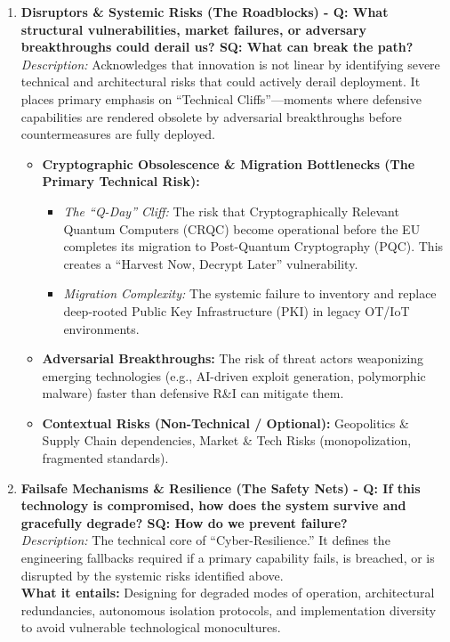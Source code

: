 \documentclass[12pt,a4paper]{article}
\begin{document}
\begin{enumerate}
    \item \textbf{Disruptors \& Systemic Risks (The Roadblocks) - Q: What structural vulnerabilities, market failures, or adversary breakthroughs could derail us? SQ: What can break the path?}\\
    \textit{Description:} Acknowledges that innovation is not linear by identifying severe technical and architectural risks that could actively derail deployment. It places primary emphasis on ``Technical Cliffs''---moments where defensive capabilities are rendered obsolete by adversarial breakthroughs before countermeasures are fully deployed.
    \begin{itemize}
        \item \textbf{Cryptographic Obsolescence \& Migration Bottlenecks (The Primary Technical Risk):}
        \begin{itemize}
            \item \textit{The ``Q-Day'' Cliff:} The risk that Cryptographically Relevant Quantum Computers (CRQC) become operational before the EU completes its migration to Post-Quantum Cryptography (PQC). This creates a ``Harvest Now, Decrypt Later'' vulnerability.
            \item \textit{Migration Complexity:} The systemic failure to inventory and replace deep-rooted Public Key Infrastructure (PKI) in legacy OT/IoT environments.
        \end{itemize}
        \item \textbf{Adversarial Breakthroughs:} The risk of threat actors weaponizing emerging technologies (e.g., AI-driven exploit generation, polymorphic malware) faster than defensive R\&I can mitigate them.
        \item \textbf{Contextual Risks (Non-Technical / Optional):} Geopolitics \& Supply Chain dependencies, Market \& Tech Risks (monopolization, fragmented standards).
    \end{itemize}

    \item \textbf{Failsafe Mechanisms \& Resilience (The Safety Nets) - Q: If this technology is compromised, how does the system survive and gracefully degrade? SQ: How do we prevent failure?}\\
    \textit{Description:} The technical core of ``Cyber-Resilience.'' It defines the engineering fallbacks required if a primary capability fails, is breached, or is disrupted by the systemic risks identified above.\\
    \textbf{What it entails:} Designing for degraded modes of operation, architectural redundancies, autonomous isolation protocols, and implementation diversity to avoid vulnerable technological monocultures.


\end{enumerate}
\end{document}
